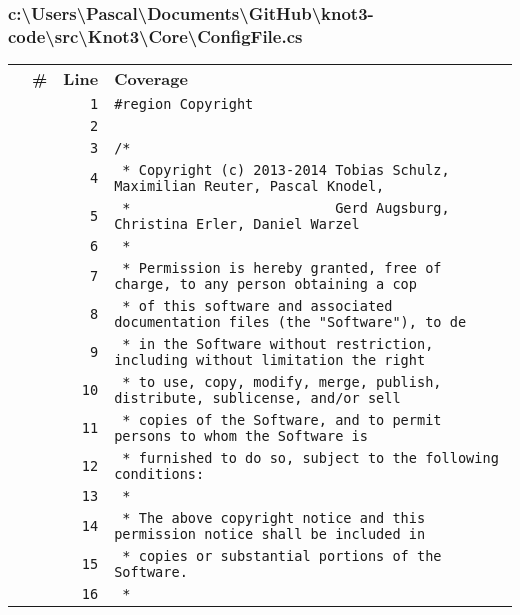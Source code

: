 \documentclass[a4paper,10pt]{article}
\begin{document}
\subsubsection{c:\textbackslash Users\textbackslash Pascal\textbackslash Documents\textbackslash GitHub\textbackslash knot3-code\textbackslash src\textbackslash Knot3\textbackslash Core\textbackslash ConfigFile.cs}
\begin{longtable}[l]{lrrl}
\textbf{} & \textbf{\#} & \textbf{Line} & \textbf{Coverage}\\
\cellcolor{gray} &  & \verb~1~ & \verb~#region Copyright~\\
\cellcolor{gray} &  & \verb~2~ & \verb~~\\
\cellcolor{gray} &  & \verb~3~ & \verb~/*~\\
\cellcolor{gray} &  & \verb~4~ & \verb~ * Copyright (c) 2013-2014 Tobias Schulz, Maximilian Reuter, Pascal Knodel,~\\
\cellcolor{gray} &  & \verb~5~ & \verb~ *                         Gerd Augsburg, Christina Erler, Daniel Warzel~\\
\cellcolor{gray} &  & \verb~6~ & \verb~ *~\\
\cellcolor{gray} &  & \verb~7~ & \verb~ * Permission is hereby granted, free of charge, to any person obtaining a cop~\\
\cellcolor{gray} &  & \verb~8~ & \verb~ * of this software and associated documentation files (the "Software"), to de~\\
\cellcolor{gray} &  & \verb~9~ & \verb~ * in the Software without restriction, including without limitation the right~\\
\cellcolor{gray} &  & \verb~10~ & \verb~ * to use, copy, modify, merge, publish, distribute, sublicense, and/or sell~\\
\cellcolor{gray} &  & \verb~11~ & \verb~ * copies of the Software, and to permit persons to whom the Software is~\\
\cellcolor{gray} &  & \verb~12~ & \verb~ * furnished to do so, subject to the following conditions:~\\
\cellcolor{gray} &  & \verb~13~ & \verb~ *~\\
\cellcolor{gray} &  & \verb~14~ & \verb~ * The above copyright notice and this permission notice shall be included in ~\\
\cellcolor{gray} &  & \verb~15~ & \verb~ * copies or substantial portions of the Software.~\\
\cellcolor{gray} &  & \verb~16~ & \verb~ *~\\

\end{longtable}
\end{document}

